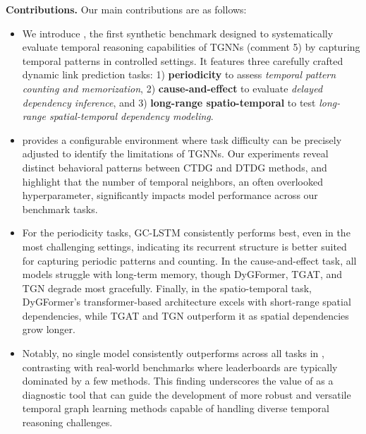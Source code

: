 \textbf{Contributions.} Our main contributions are as follows:
\begin{itemize} 
    \item We introduce \benchmarkname, the first synthetic benchmark designed to systematically evaluate temporal reasoning capabilities of TGNNs (comment 5) by capturing temporal patterns in controlled settings. It features three carefully crafted dynamic link prediction tasks: 1) \textbf{periodicity} to assess \textit{temporal pattern counting and memorization}, 2) \textbf{cause-and-effect} to evaluate \textit{delayed dependency inference}, and 3) \textbf{long-range spatio-temporal} to test \textit{long-range spatial-temporal dependency modeling}.
    
    \item \benchmarkname provides a configurable environment where task difficulty can be precisely adjusted to identify the limitations of TGNNs. Our experiments reveal distinct behavioral patterns between CTDG and DTDG methods, and highlight that the number of temporal neighbors, an often overlooked hyperparameter, significantly impacts model performance across our benchmark tasks.
    

     \item For the periodicity tasks, GC-LSTM consistently performs best, even in the most challenging settings, indicating its recurrent structure is better suited for capturing periodic patterns and counting. In the cause-and-effect task, all models struggle with long-term memory, though DyGFormer, TGAT, and TGN degrade most gracefully. Finally, in the spatio-temporal task, DyGFormer's transformer-based architecture excels with short-range spatial dependencies, while TGAT and TGN outperform it as spatial dependencies grow longer.

    
    \item Notably, no single model consistently outperforms across all tasks in \benchmarkname, contrasting with real-world benchmarks where leaderboards are typically dominated by a few methods. This finding underscores the value of \benchmarkname as a diagnostic tool that can guide the development of more robust and versatile temporal graph learning methods capable of handling diverse temporal reasoning challenges.
\end{itemize}